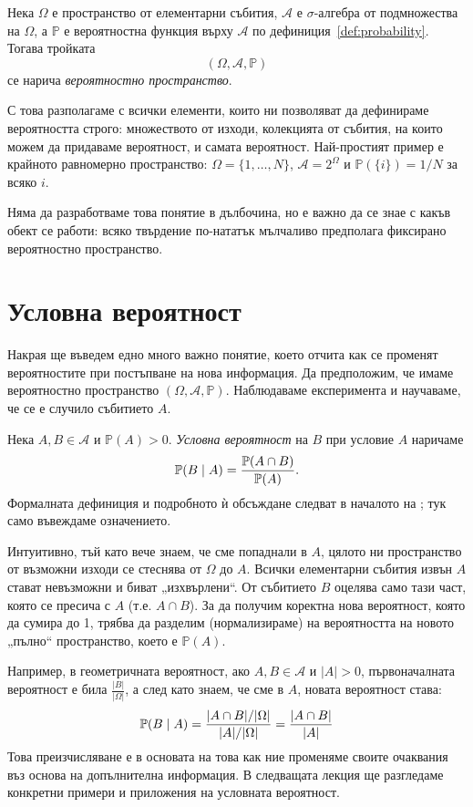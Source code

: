 \begin{keydefn}\label{def:prob-space}
Нека $\Omega$ е пространство от елементарни събития, $\mathcal{A}$ е $\sigma$-алгебра от
подмножества на $\Omega$, а $\mathbb{P}$ е вероятностна функция върху $\mathcal{A}$ по
дефиниция~\ref{def:probability}. Тогава тройката
\[ (\Omega, \mathcal{A}, \mathbb{P}) \]
се нарича \emph{вероятностно пространство}.
\end{keydefn}

С това разполагаме с всички елементи, които ни позволяват да дефинираме вероятността
строго: множеството от изходи, колекцията от събития, на които можем да придаваме
вероятност, и самата вероятност. Най-простият пример е крайното равномерно пространство:
$\Omega = \{1, \dots, N\}$, $\mathcal{A} = 2^\Omega$ и $\mathbb{P}(\{i\}) = 1/N$ за всяко $i$.

Няма да разработваме това понятие в дълбочина, но е важно да се знае с какъв обект се
работи: всяко твърдение по-нататък мълчаливо предполага фиксирано вероятностно
пространство.

\section{Условна вероятност}

Накрая ще въведем едно много важно понятие, което отчита как се променят вероятностите при постъпване на нова информация. Да предположим, че имаме вероятностно пространство $(\Omega, \mathcal{A}, \mathbb{P})$. Наблюдаваме експеримента и научаваме, че се е случило събитието $A$.

Нека $A, B \in \mathcal{A}$ и $\mathbb{P}(A) > 0$. \emph{Условна вероятност} на $B$ при условие $A$ наричаме
\[ \mathbb{P}(B \mid A) = \frac{\mathbb{P}(A \cap B)}{\mathbb{P}(A)} . \]
Формалната дефиниция и подробното ѝ обсъждане следват в началото на
; тук само въвеждаме означението.

Интуитивно, тъй като вече знаем, че сме попаднали в $A$, цялото ни пространство от възможни изходи се стеснява от $\Omega$ до $A$. Всички елементарни събития извън $A$ стават невъзможни и биват „изхвърлени“. От събитието $B$ оцелява само тази част, която се пресича с $A$ (т.е. $A \cap B$).
За да получим коректна нова вероятност, която да сумира до 1, трябва да разделим (нормализираме) на вероятността на новото „пълно“ пространство, което е $\mathbb{P}(A)$.

Например, в геометричната вероятност, ако $A,B\in\mathcal{A}$ и $|A|>0$,
първоначалната вероятност е била $\frac{|B|}{|\Omega|}$, а след като знаем,
че сме в $A$, новата вероятност става:
\[ \mathbb{P}(B \mid A) = \frac{|A \cap B| / |\Omega|}{|A| / |\Omega|} = \frac{|A \cap B|}{|A|} \]
Това преизчисляване е в основата на това как ние променяме своите очаквания въз основа на допълнителна информация. В следващата лекция ще разгледаме конкретни примери и приложения на условната вероятност.

